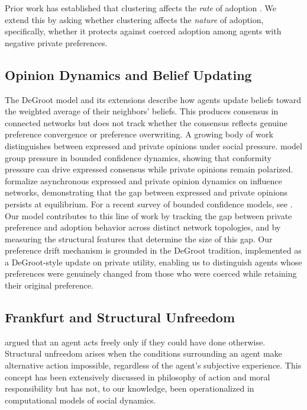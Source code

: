 \documentclass[11pt, a4paper]{article}
\begin{document}
Prior work has established that clustering affects the \textit{rate} of adoption \citep{centola2010spread, miller2009spread}. We extend this by asking whether clustering affects the \textit{nature} of adoption, specifically, whether it protects against coerced adoption among agents with negative private preferences.

\subsection{Opinion Dynamics and Belief Updating}

The DeGroot model \citep{degroot1974reaching} and its extensions \citep{friedkin1990social} describe how agents update beliefs toward the weighted average of their neighbors' beliefs. This produces consensus in connected networks but does not track whether the consensus reflects genuine preference convergence or preference overwriting. A growing body of work distinguishes between expressed and private opinions under social pressure. \citet{cheng2019opinion} model group pressure in bounded confidence dynamics, showing that conformity pressure can drive expressed consensus while private opinions remain polarized. \citet{xia2023expressed} formalize asynchronous expressed and private opinion dynamics on influence networks, demonstrating that the gap between expressed and private opinions persists at equilibrium. For a recent survey of bounded confidence models, see \citet{bernardo2024bounded}. Our model contributes to this line of work by tracking the gap between private preference and adoption behavior across distinct network topologies, and by measuring the structural features that determine the size of this gap. Our preference drift mechanism is grounded in the DeGroot tradition, implemented as a DeGroot-style update on private utility, enabling us to distinguish agents whose preferences were genuinely changed from those who were coerced while retaining their original preference.

\subsection{Frankfurt and Structural Unfreedom}

\citet{frankfurt1971freedom} argued that an agent acts freely only if they could have done otherwise. Structural unfreedom arises when the conditions surrounding an agent make alternative action impossible, regardless of the agent's subjective experience. This concept has been extensively discussed in philosophy of action and moral responsibility \citep{fischer1998responsibility, mele2006free} but has not, to our knowledge, been operationalized in computational models of social dynamics.
\end{document}
